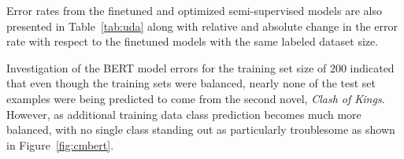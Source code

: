 \documentclass[twoside,twocolumn,10pt]{article}
\begin{document}
Error rates from the finetuned and optimized semi-supervised models are also presented in Table~\ref{tab:uda} along with relative and absolute change in the error rate with respect to the finetuned models with the same labeled dataset size.

\begin{table}
\end{table} 



Investigation of the BERT model errors for the training set size of 200 indicated that even though the training sets were balanced, nearly none of the test set examples were being predicted to come from the second novel, \textit{Clash of Kings}. However, as additional training data class prediction becomes much more balanced, with no single class standing out as particularly troublesome as shown in Figure~\ref{fig:cmbert}.
\end{document}
